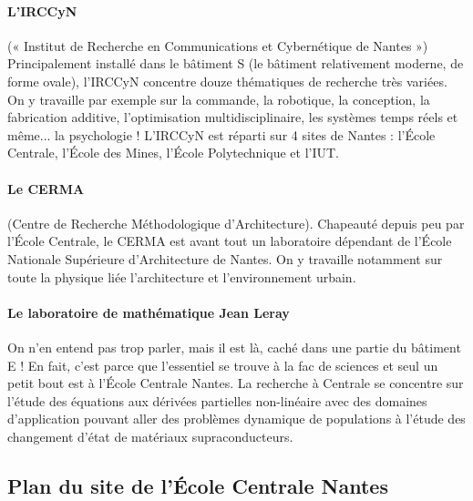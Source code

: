 \paragraph{L'IRCCyN} (« Institut de Recherche en Communications et Cybernétique de Nantes ») Principalement installé dans le bâtiment S (le bâtiment relativement moderne, de forme ovale), l'IRCCyN concentre douze thématiques de recherche très variées. On y travaille par exemple sur la commande, la robotique, la conception, la fabrication additive, l'optimisation multidisciplinaire, les systèmes temps réels et même... la psychologie ! L'IRCCyN est réparti sur 4 sites de Nantes : l'École Centrale, l'École des Mines, l'École Polytechnique et l'IUT.
\paragraph{Le CERMA} (Centre de Recherche Méthodologique d'Architecture). Chapeauté depuis peu par l'École Centrale, le CERMA est avant tout un laboratoire dépendant de l'École Nationale Supérieure d'Architecture de Nantes. On y travaille notamment sur toute la physique liée l'architecture et l'environnement urbain.
\paragraph{Le laboratoire de mathématique Jean Leray} On n'en entend pas trop parler, mais il est là, caché dans une partie du bâtiment E ! En fait, c'est parce que l'essentiel se trouve à la fac de sciences et seul un petit bout est à l'École Centrale Nantes. La recherche à Centrale se concentre sur l'étude des équations aux dérivées partielles non-linéaire avec des domaines d'application pouvant aller des problèmes dynamique de populations à l'étude des changement d'état de matériaux supraconducteurs.

\subsection{Plan du site de l’École Centrale Nantes}\trad
{}